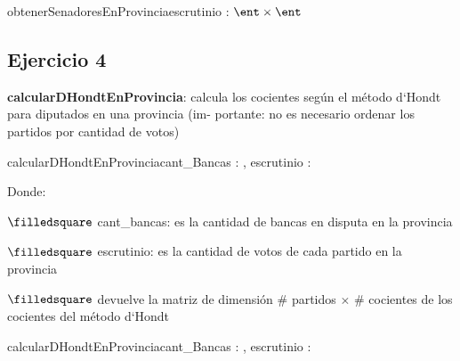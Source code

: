 \documentclass[10pt,a4paper]{article}
\begin{document}
\begin{proc}{obtenerSenadoresEnProvincia}{\In escrutinio : \TLista{\ent}}{$\ent \times \ent$} 
\end{proc}


\vspace{0.3cm}
{}

\pagebreak






\subsection{Ejercicio 4} 

\textbf{calcularDHondtEnProvincia}: calcula los cocientes según el método d`Hondt para diputados en una provincia (im-
portante: no es necesario ordenar los partidos por cantidad de votos)

\begin{proc}{calcularDHondtEnProvincia}{\In cant\_Bancas : \ent , \In escrutinio : \TLista{\ent}}{\TLista{\TLista{\ent}}}
\end{proc}

Donde:

\quad $\filledsquare$ cant\_bancas: es la cantidad de bancas en disputa en la provincia

\quad $\filledsquare$ escrutinio: es la cantidad de votos de cada partido en la provincia

\quad $\filledsquare$ devuelve la matriz de dimensión $\#$ partidos $\times$ $\#$ cocientes de los cocientes del método d`Hondt

\vspace{0.3cm}
\vspace{0.3cm}

\begin{proc}{calcularDHondtEnProvincia}{\In cant\_Bancas : \ent , \In escrutinio : \TLista{\ent}}{\TLista{\TLista{\ent}}} 
\end{proc}
\end{document}

